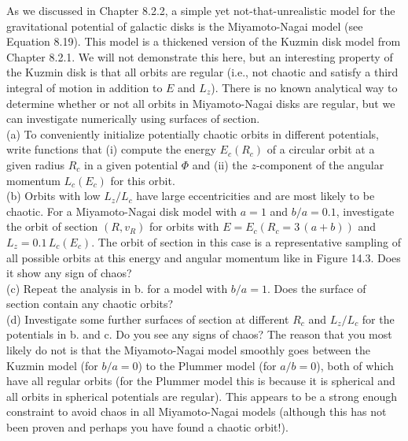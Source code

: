 \documentclass[12pt]{article}
\begin{document}
As we discussed in Chapter 8.2.2, a simple yet not-that-unrealistic model for the 
gravitational potential of galactic disks is the Miyamoto-Nagai model (see Equation 8.19). 
This model is a thickened version of the Kuzmin disk model from Chapter 8.2.1. We will 
not demonstrate this here, but an interesting property of the Kuzmin disk is that all
orbits are regular (i.e., not chaotic and satisfy a third integral of motion in addition 
to $E$ and $L_z$). There is no known analytical way to determine whether or not all 
orbits in Miyamoto-Nagai disks are regular, but we can investigate numerically using 
surfaces of section.\\

(a) To conveniently initialize potentially chaotic orbits in different potentials, write 
functions that (i) compute the energy \(E_c(R_c)\) of a circular orbit at a given radius 
\(R_c\) in a given potential \(\Phi\) and (ii) the \(z\)-component of the angular momentum 
\(L_c(E_c)\) for this orbit.\\

(b) Orbits with low \(L_z/L_c\) have large eccentricities and are most likely to be 
chaotic. For a Miyamoto-Nagai disk model with \(a=1\) and \(b/a = 0.1\), investigate 
the orbit of section $(R,v_R)$ for orbits with \(E = E_c(R_c = 3\,(a+b))\) and 
\(L_z = 0.1\,L_c(E_c)\). The orbit of section in this case is a representative sampling 
of all possible orbits at this energy and angular momentum like in Figure 14.3. Does it 
show any sign of chaos?\\

(c) Repeat the analysis in b. for a model with \(b/a = 1\). Does the surface of section 
contain any chaotic orbits?\\

(d) Investigate some further surfaces of section at different \(R_c\) and \(L_z/L_c\) for 
the potentials in b. and c. Do you see any signs of chaos? The reason that you most likely 
do not is that the Miyamoto-Nagai model smoothly goes between the Kuzmin 
model (for \(b/a=0\)) to the Plummer model (for \(a/b=0\)), both of which have all 
regular orbits (for the Plummer model this is because it is spherical and all orbits in 
spherical potentials are regular). This appears to be a strong enough constraint to 
avoid chaos in all Miyamoto-Nagai models (although this has not been 
proven and perhaps you have found a chaotic orbit!).
\end{document}
